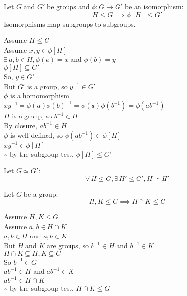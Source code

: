 \documentclass[letterpaper,12pt,fleqn]{article}
\newcommand{\p}{\phi}
\begin{document}
\begin{theorem}
  Let $G$ and $G'$ be groups and $\p:G\to G'$ be an isomorphism:
  \[H\le G\implies \p[H]\le G'\]
  Isomorphisms map subgroups to subgroups.
\end{theorem}

\begin{theproof}
  Assume $H\le G$ \\
  Assume $x,y\in\p[H]$ \\
  $\exists\,a,b\in H,\p(a)=x$ and $\p(b)=y$ \\
  $\p[H]\subseteq G'$ \\
  So, $y\in G'$ \\
  But $G'$ is a group, so $y^{-1}\in G'$ \\
  $\p$ is a homomorphism \\
  $xy^{-1}=\p(a)\p(b)^{-1}=\p(a)\p(b^{-1})=\p(ab^{-1})$ \\
  $H$ is a group, so $b^{-1}\in H$ \\
  By closure, $ab^{-1}\in H$ \\
  $\p$ is well-defined, so $\p(ab^{-1})\in \p[H]$ \\
  $xy^{-1}\in\p[H]$ \\
  $\therefore$ by the subgroup test, $\p[H]\le G'$
\end{theproof}

\begin{corollary}
  Let $G\simeq G'$:
  \[\forall\,H\le G,\exists\,H'\le G',H\simeq H'\]
\end{corollary}
\newpage
\begin{theorem}
  Let $G$ be a group:
  \[H,K\le G\implies H\cap K\le G\]
\end{theorem}

\begin{theproof}
  Assume $H,K\le G$ \\
  Assume $a,b\in H\cap K$ \\
  $a,b\in H$ and $a,b\in K$ \\
  But $H$ and $K$ are groups, so $b^{-1}\in H$ and $b^{-1}\in K$ \\
  $H\cap K\subseteq H,K\subseteq G$ \\
  So $b^{-1}\in G$ \\
  $ab^{-1}\in H$ and $ab^{-1}\in K$ \\
  $ab^{-1}\in H\cap K$ \\
  $\therefore$ by the subgroup test, $H\cap K\le G$
\end{theproof}
\end{document}

